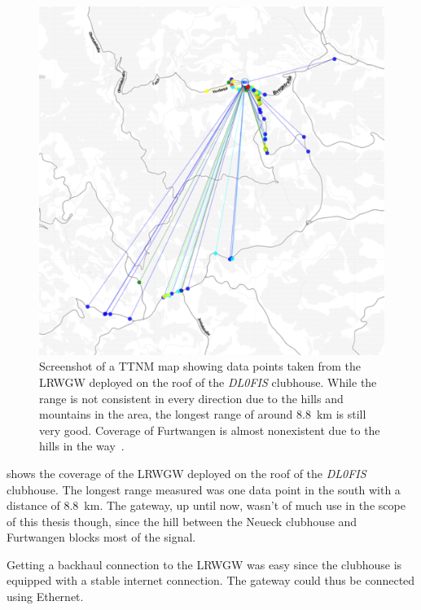 \begin{figure}[htbp]
    \centering
    \includegraphics[width=1\textwidth]{pictures/ttn-mapper/gateway-ranges/dl0fis_gw_range.jpg}
    \caption{
        Screenshot of a \ac{TTNM} map showing data points taken from the \acl{LRWGW} deployed on the roof of the \emph{DL0FIS} clubhouse.
        While the range is not consistent in every direction due to the hills and mountains in the area, the longest range of around \SI{8.8}{\kilo\meter} is still very good.
        Coverage of Furtwangen is almost nonexistent due to the hills in the way~\cite{ttn_mapper_ttn_2023}.
    }\label{pic:dl0fis_gw_range}
\end{figure}

 shows the coverage of the \acl{LRWGW} deployed on the roof of the \emph{DL0FIS} clubhouse.
The longest range measured was one data point in the south with a distance of \SI{8.8}{\kilo\meter}.
The gateway, up until now, wasn't of much use in the scope of this thesis though, since the hill between the Neueck clubhouse and Furtwangen blocks most of the signal.


Getting a backhaul connection to the \acl{LRWGW} was easy since the clubhouse is equipped with a stable internet connection.
The gateway could thus be connected using Ethernet.

